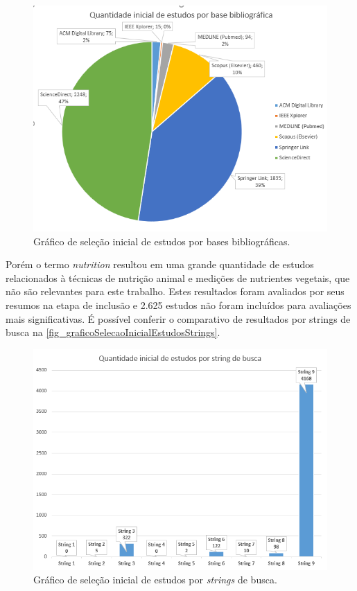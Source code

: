 \begin{figure}[htb]
	\caption{\label{fig_graficoSelecaoInicialEstudos}Gráfico de seleção inicial de estudos por bases bibliográficas.}
	\begin{center}
	    \includegraphics[scale=0.5]{Imagens/grafico - selecao inicial de estudos por base.png}
	\end{center}
\end{figure}

Porém o termo \textit{nutrition} resultou em uma grande quantidade de estudos relacionados à técnicas de nutrição animal e medições de nutrientes vegetais, que não são relevantes para este trabalho. Estes resultados foram avaliados por seus resumos na etapa de inclusão e 2.625 estudos não foram incluídos para avaliações mais significativas. É possível conferir o comparativo de resultados por strings de busca na \autoref{fig_graficoSelecaoInicialEstudosStrings}.

\begin{figure}[htb]
	\caption{\label{fig_graficoSelecaoInicialEstudosStrings}Gráfico de seleção inicial de estudos por \textit{strings} de busca.}
	\begin{center}
	    \includegraphics[scale=0.52]{Imagens/grafico - selecao inicial de estudos por string.png}
	\end{center}
\end{figure}

